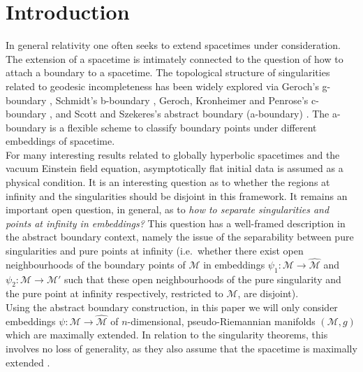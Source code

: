 \documentclass[pdflatex,sn-mathphys-num]{sn-jnl}
\theoremstyle{definition}
\begin{document}
\section{Introduction}
In general relativity one often seeks to extend spacetimes under consideration. The extension of a spacetime is intimately connected to the question of how to attach a boundary to a spacetime. The topological structure of singularities related to geodesic incompleteness has been widely explored via Geroch's g-boundary \cite{geroch1968local}, Schmidt's b-boundary \cite{schmidt1971new}, Geroch, Kronheimer and Penrose's c-boundary \cite{geroch1972ideal,garcia2005causal}, and Scott and Szekeres's abstract boundary (a-boundary) \cite{scott1994abstract}. The a-boundary is a flexible scheme to classify boundary points under different embeddings of spacetime.\\

For many interesting results related to globally hyperbolic spacetimes and the vacuum Einstein field equation, asymptotically flat initial data is assumed as a physical condition. It is an interesting question as to whether the regions at infinity and the singularities should be disjoint in this framework. It remains an important open question, in general, as to \textit{how to separate singularities and points at infinity in embeddings?} This question has a well-framed description in the abstract boundary context, namely the issue of the separability between pure singularities and pure points at infinity (i.e.\ whether there exist open neighbourhoods of the boundary points of $\mathcal{M}$ in embeddings $\psi_1: \mathcal{M} \rightarrow \hat{\mathcal{M}}$ and $\psi_2: \mathcal{M} \rightarrow \mathcal{M}'$ such that these open neighbourhoods of the pure singularity and the pure point at infinity respectively, restricted to $\mathcal{M}$, are disjoint).\\

Using the abstract boundary construction, in this paper we will only consider embeddings $\psi:\mathcal{M} \rightarrow \hat{\mathcal{M}}$ of $n$-dimensional, pseudo-Riemannian manifolds $(\mathcal{M},g)$ which are maximally extended. In relation to the singularity theorems, this involves no loss of generality, as they also assume that the spacetime is maximally extended \cite{whale2015generalizations}.\\

\end{document}
